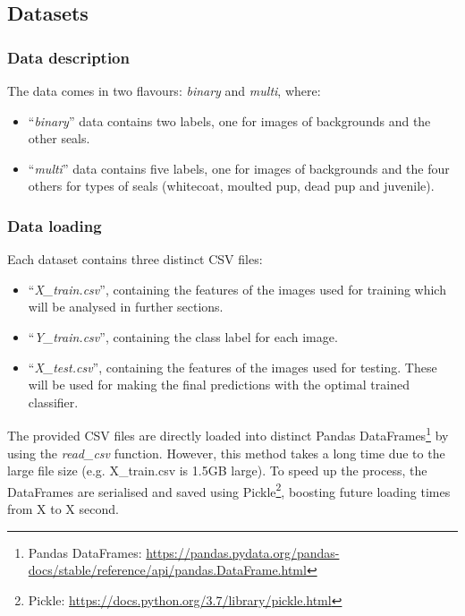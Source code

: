 \documentclass[letterpaper,12pt]{article}
\begin{document}
\subsection{Datasets}

\subsubsection{Data description}

The data comes in two flavours: \textit{binary} and \textit{multi}, where:
\begin{itemize}
    \item ``\textit{binary}'' data contains two labels, one for images of backgrounds and the other seals.
    \item ``\textit{multi}'' data contains five labels, one for images of backgrounds and the four others for types of seals (whitecoat, moulted pup, dead pup and juvenile).
\end{itemize}

\subsubsection{Data loading}

Each dataset contains three distinct CSV files:
\begin{itemize}
    \item ``\textit{X\_train.csv}'', containing the features of the images used for training which will be analysed in further sections.
    \item ``\textit{Y\_train.csv}'', containing the class label for each image.
    \item ``\textit{X\_test.csv}'', containing the features of the images used for testing. These will be used for making the final predictions with the optimal trained classifier.
\end{itemize}

The provided CSV files are directly loaded into distinct Pandas DataFrames\footnote{Pandas DataFrames: \url{https://pandas.pydata.org/pandas-docs/stable/reference/api/pandas.DataFrame.html}} by using the \textit{read\_csv} function. However, this method takes a long time due to the large file size (e.g. X\_train.csv is 1.5GB large). To speed up the process, the DataFrames are serialised and saved using Pickle\footnote{Pickle: \url{https://docs.python.org/3.7/library/pickle.html}}, boosting future loading times from X to X second.

\end{document}
